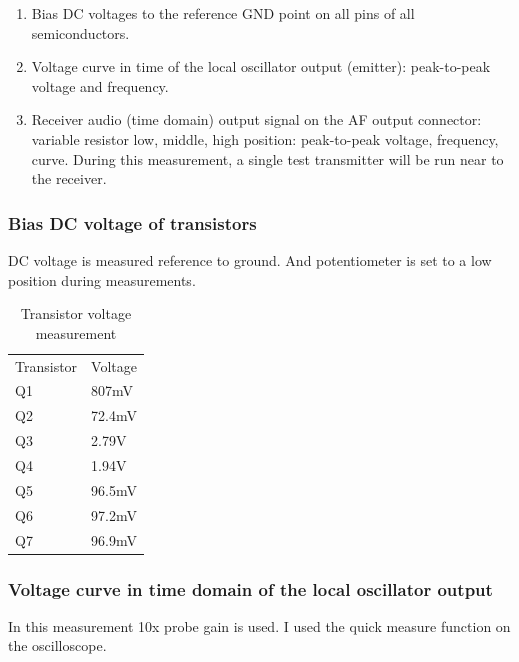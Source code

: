 \documentclass[
11pt, %
a4paper, %
oneside, %
headinclude,footinclude, %
BCOR5mm, %
]{scrartcl}
\begin{document}
\begin{enumerate}
\item Bias DC voltages to the reference GND point on all pins of all semiconductors.
\item Voltage curve in time of the local oscillator output (emitter): peak-to-peak voltage and frequency.
\item Receiver audio (time domain) output signal on the AF output connector: 
variable resistor low, middle, high position: 
peak-to-peak voltage, frequency, curve. During this measurement, 
a single test transmitter will be run near to the receiver.
\end{enumerate}

\subsubsection{Bias DC voltage of transistors}
DC voltage is measured reference to ground. And potentiometer is set to
a low position during measurements.


\begin{table}[h]\centering
    \begin{tabular}{|l|l|}
        \cline{1-2}
        Transistor & Voltage \\
        \cline{1-2}
        Q1 & 807mV \\
        Q2 & 72.4mV \\
        Q3 & 2.79V \\
        Q4 & 1.94V \\
        Q5 & 96.5mV \\
        Q6 & 97.2mV \\
        Q7 & 96.9mV \\
        \cline{1-2}
    \end{tabular}
    \caption{Transistor voltage measurement}
\end{table}

\newpage

\subsubsection{Voltage curve in time domain of the local oscillator output}
In this measurement 10x probe gain is used. I used the quick measure function
on the oscilloscope.
\end{document}
